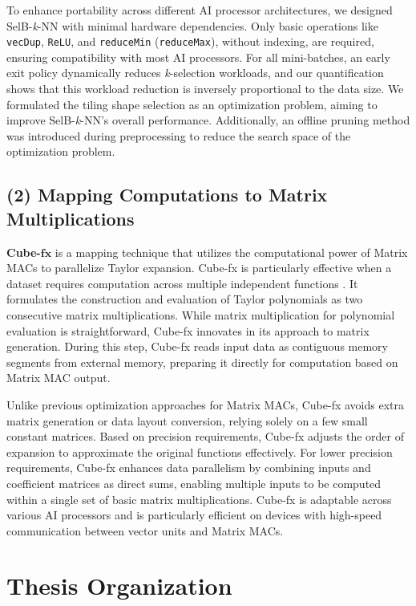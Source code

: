 To enhance portability across different AI processor architectures, we designed SelB-\textit{k}-NN with minimal hardware dependencies. Only basic operations like \verb|vecDup|, \verb|ReLU|, and \verb|reduceMin| (\verb|reduceMax|), without indexing, are required, ensuring compatibility with most AI processors. For all mini-batches, an early exit policy dynamically reduces \textit{k}-selection workloads, and our quantification shows that this workload reduction is inversely proportional to the data size. We formulated the tiling shape selection as an optimization problem, aiming to improve SelB-\textit{k}-NN's overall performance. Additionally, an offline pruning method was introduced during preprocessing to reduce the search space of the optimization problem.

\subsection{(2) Mapping Computations to Matrix Multiplications}

\textbf{Cube-}$\mathbf{fx}$ is a mapping technique that utilizes the computational power of Matrix MACs to parallelize Taylor expansion. Cube-fx is particularly effective when a dataset requires computation across multiple independent functions \cite{boyd2004convex, deller1993discrete, DBLP:conf/icpr/ManessiR18}. It formulates the construction and evaluation of Taylor polynomials as two consecutive matrix multiplications. While matrix multiplication for polynomial evaluation is straightforward, Cube-fx innovates in its approach to matrix generation. During this step, Cube-fx reads input data as contiguous memory segments from external memory, preparing it directly for computation based on Matrix MAC output.

Unlike previous optimization approaches for Matrix MACs, Cube-fx avoids extra matrix generation or data layout conversion, relying solely on a few small constant matrices. Based on precision requirements, Cube-fx adjusts the order of expansion to approximate the original functions effectively. For lower precision requirements, Cube-fx enhances data parallelism by combining inputs and coefficient matrices as direct sums, enabling multiple inputs to be computed within a single set of basic matrix multiplications. Cube-fx is adaptable across various AI processors and is particularly efficient on devices with high-speed communication between vector units and Matrix MACs.

\section{Thesis Organization}
\label{sec_1_4_organization}

